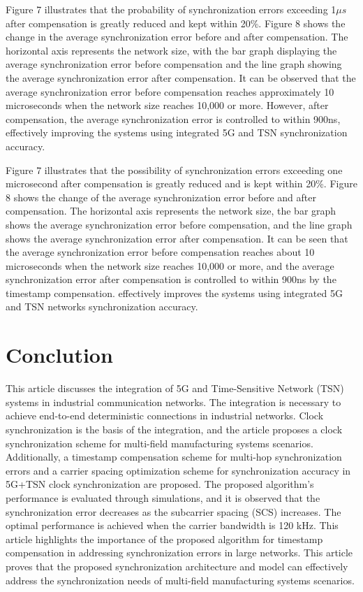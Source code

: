\documentclass[english]{cccconf}
\begin{document}
Figure 7 illustrates that the probability of synchronization errors exceeding 1$\mu s$ after compensation is greatly reduced and kept within 20\%. Figure 8 shows the change in the average synchronization error before and after compensation. The horizontal axis represents the network size, with the bar graph displaying the average synchronization error before compensation and the line graph showing the average synchronization error after compensation. It can be observed that the average synchronization error before compensation reaches approximately 10 microseconds when the network size reaches 10,000 or more. However, after compensation, the average synchronization error is controlled to within 900ns, effectively improving the systems using integrated 5G and TSN synchronization accuracy.

Figure 7 illustrates that the possibility of synchronization errors exceeding one microsecond after compensation is greatly reduced and is kept within 20\%. Figure 8 shows the change of the average synchronization error before and after compensation. The horizontal axis represents the network size, the bar graph shows the average synchronization error before compensation, and the line graph shows the average synchronization error after compensation. It can be seen that the average synchronization error before compensation reaches about 10 microseconds when the network size reaches 10,000 or more, and the average synchronization error after compensation is controlled to within 900ns by the timestamp compensation. effectively improves the systems using integrated 5G and TSN networks synchronization accuracy.
\section{Conclution}
This article discusses the integration of 5G and Time-Sensitive Network (TSN) systems in industrial communication networks. The integration is necessary to achieve end-to-end deterministic connections in industrial networks. Clock synchronization is the basis of the integration, and the article proposes a clock synchronization scheme for multi-field manufacturing systems scenarios. Additionally, a timestamp compensation scheme for multi-hop synchronization errors and a carrier spacing optimization scheme for synchronization accuracy in 5G+TSN clock synchronization are proposed. The proposed algorithm's performance is evaluated through simulations, and it is observed that the synchronization error decreases as the subcarrier spacing (SCS) increases. The optimal performance is achieved when the carrier bandwidth is 120 kHz. This article highlights the importance of the proposed algorithm for timestamp compensation in addressing synchronization errors in large networks. This article proves that the proposed synchronization architecture and model can effectively address the synchronization needs of multi-field manufacturing systems scenarios.


\end{document}
